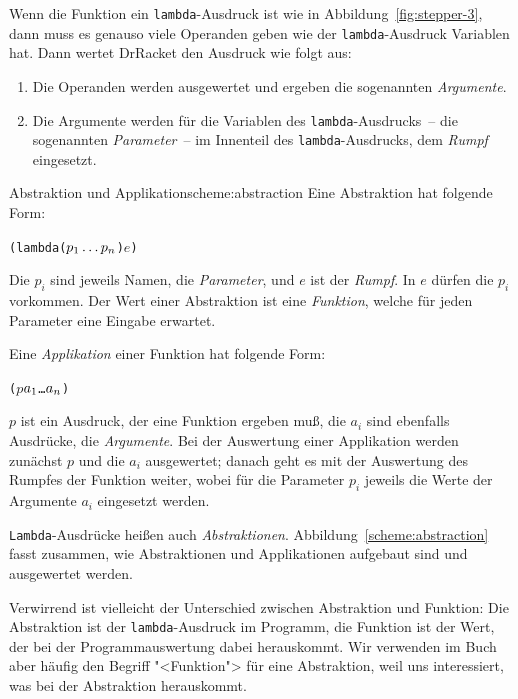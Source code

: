 Wenn die Funktion ein \texttt{lambda}-Ausdruck ist wie in
Abbildung~\ref{fig:stepper-3}, dann muss es genauso viele Operanden
geben wie der \texttt{lambda}-Ausdruck Variablen hat.
Dann wertet DrRacket den Ausdruck wie folgt aus:
%
\begin{enumerate}
\item Die Operanden werden ausgewertet und ergeben die sogenannten
  \textit{Argumente}.\label{sec:argument}
\item Die Argumente werden für die
  Variablen des \texttt{lambda}-Ausdrucks~-- die sogenannten
  \textit{Parameter}~-- im Innenteil des
  \texttt{lambda}-Ausdrucks, dem \textit{Rumpf}
  eingesetzt.
\end{enumerate}
%
\begin{feature}{Abstraktion und Applikation}{scheme:abstraction}
  Eine Abstraktion hat folgende Form:
\begin{alltt}
(lambda (\(p\sb{1} \ldots p\sb{n}\)) \(e\))
\end{alltt}
  Die $p_i$ sind jeweils Namen, die \textit{Parameter}, und
  $e$ ist der \textit{Rumpf}.  In $e$ dürfen die $p_i$
  vorkommen.  Der Wert einer Abstraktion ist eine \textit{Funktion},
  welche für jeden Parameter eine Eingabe erwartet.

  Eine \textit{Applikation} einer Funktion hat folgende Form:
\begin{alltt}
(\(p\) \(a\sb{1}\) \ldots \(a\sb{n}\))
\end{alltt}
  $p$ ist ein Ausdruck, der eine Funktion ergeben muß, die $a_i$ sind
  ebenfalls Ausdrücke, die \textit{Argumente}.  Bei
  der Auswertung einer Applikation werden zunächst $p$ und die $a_i$
  ausgewertet; danach geht es mit der Auswertung des Rumpfes der
  Funktion weiter, wobei für die Parameter $p_i$ jeweils die Werte der
  Argumente $a_i$ eingesetzt werden.
\end{feature}
%
\texttt{Lambda}-Ausdrücke heißen auch
\textit{Abstraktionen}.
Abbildung~\ref{scheme:abstraction} fasst zusammen, wie Abstraktionen
und Applikationen aufgebaut sind und ausgewertet werden.

Verwirrend ist vielleicht der Unterschied zwischen Abstraktion und
Funktion: Die Abstraktion ist der \texttt{lambda}-Ausdruck im
Programm, die Funktion ist der Wert, der bei der Programmauswertung
dabei herauskommt.  Wir verwenden im Buch aber häufig den Begriff
"<Funktion"> für eine Abstraktion, weil uns interessiert, was bei der
Abstraktion herauskommt.

